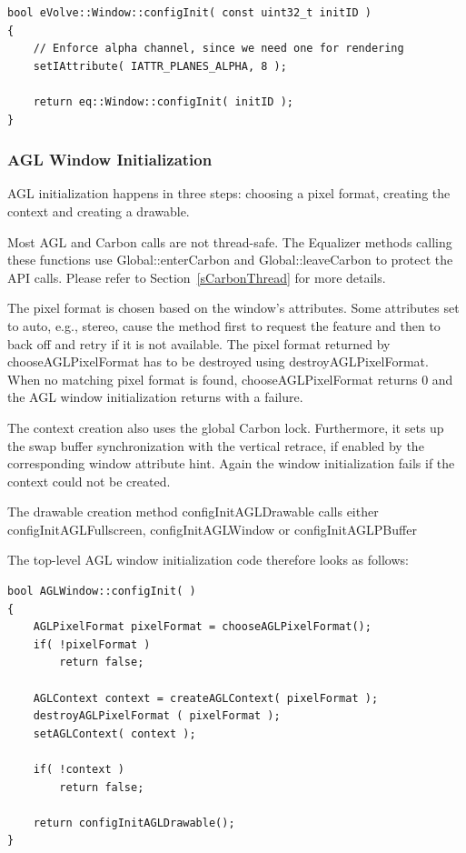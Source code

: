 \documentclass[10pt,a4]{scrartcl}
\newcommand{\sref}[1]{Section~\ref{#1}}
\begin{document}
{\footnotesize\begin{lstlisting}
bool eVolve::Window::configInit( const uint32_t initID )
{
    // Enforce alpha channel, since we need one for rendering
    setIAttribute( IATTR_PLANES_ALPHA, 8 );

    return eq::Window::configInit( initID );
}
\end{lstlisting}}


\subsubsection{AGL Window Initialization}

AGL initialization happens in three steps: choosing a pixel format,
creating the context and creating a drawable. 

Most AGL and Carbon calls are not thread-safe. The Equalizer methods
calling these functions use \textsf{Global::enterCarbon} and
\textsf{Global::leaveCarbon} to protect the API calls. Please refer to
\sref{sCarbonThread} for more details.

The pixel format is chosen based on the window's attributes. Some
attributes set to auto, e.g., stereo, cause the method first to request
the feature and then to back off and retry if it is not available. The
pixel format returned by \textsf{chooseAGLPixelFormat} has to be
destroyed using \textsf{destroyAGLPixelFormat}. When no matching pixel
format is found, \textsf{chooseAGLPixelFormat} returns \textsf{0} and
the AGL window initialization returns with a failure.

The context creation also uses the global Carbon lock. Furthermore, it
sets up the swap buffer synchronization with the vertical retrace, if
enabled by the corresponding window attribute hint. Again the window
initialization fails if the context could not be created.

The drawable creation method \textsf{configInitAGLDrawable} calls either
\textsf{configInitAGLFullscreen}, \textsf{configInitAGLWindow} or \textsf{configInitAGLPBuffer}

The top-level AGL window initialization code therefore looks as follows:

{\footnotesize\begin{lstlisting}
bool AGLWindow::configInit( )
{
    AGLPixelFormat pixelFormat = chooseAGLPixelFormat();
    if( !pixelFormat )
        return false;

    AGLContext context = createAGLContext( pixelFormat );
    destroyAGLPixelFormat ( pixelFormat );
    setAGLContext( context );

    if( !context )
        return false;

    return configInitAGLDrawable();
}
\end{lstlisting}}
\end{document}

